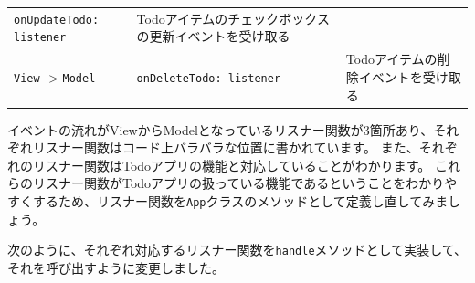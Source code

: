 \begin{longtable}[]{@{}lll@{}}
\begin{minipage}[t]{0.43\columnwidth}
\texttt{onUpdateTodo: listener}\strut
\end{minipage} & \begin{minipage}[t]{0.34\columnwidth}\raggedright
Todoアイテムのチェックボックスの更新イベントを受け取る\strut
\end{minipage}\tabularnewline
\begin{minipage}[t]{0.15\columnwidth}\raggedright
\texttt{View} -\textgreater{}
\texttt{Model}\strut
\end{minipage} & \begin{minipage}[t]{0.43\columnwidth}\raggedright
\texttt{onDeleteTodo: listener}\strut
\end{minipage} & \begin{minipage}[t]{0.34\columnwidth}\raggedright
Todoアイテムの削除イベントを受け取る\strut
\end{minipage}\tabularnewline
\bottomrule
\end{longtable}

イベントの流れがViewからModelとなっているリスナー関数が3箇所あり、それぞれリスナー関数はコード上バラバラな位置に書かれています。
また、それぞれのリスナー関数はTodoアプリの機能と対応していることがわかります。
これらのリスナー関数がTodoアプリの扱っている機能であるということをわかりやすくするため、リスナー関数を\texttt{App}クラスのメソッドとして定義し直してみましょう。

次のように、それぞれ対応するリスナー関数を\texttt{handle}メソッドとして実装して、それを呼び出すように変更しました。


